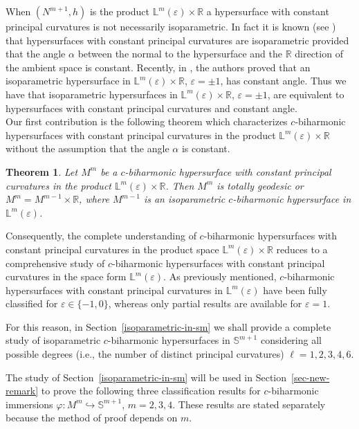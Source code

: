 \documentclass[11pt,leqno]{amsart}
\theoremstyle{plain}
\newtheorem{theorem}                {Theorem}      [section]
\theoremstyle{definition}
\numberwithin{equation}{section}
\def \R{{\mathbb R}}
\def \s{{\mathbb S}}
\numberwithin{equation}{section}
\begin{document}
When $(N^{m+1},h)$ is the product ${\mathbb L}^{m}(\varepsilon)\times \R$ a hypersurface with constant principal curvatures is not necessarily isoparametric. In fact it is known (see \cite{MR4032814}) that hypersurfaces with constant principal curvatures are isoparametric provided that the angle $\alpha$ between the normal to the hypersurface and the $\R$ direction of the ambient space is constant. Recently, in \cite{arXiv:2411.11506}, the authors proved that an isoparametric hypersurface in ${\mathbb L}^{m}(\varepsilon)\times \R$, $\varepsilon=\pm 1$, has constant angle. Thus we have that isoparametric hypersurfaces in ${\mathbb L}^{m}(\varepsilon)\times \R$, $\varepsilon=\pm 1$, are equivalent to hypersurfaces with constant principal curvatures and constant angle.\\

Our first contribution is the following theorem which characterizes $c$-biharmo\-nic hypersurfaces with constant principal curvatures in the product ${\mathbb L}^{m}(\varepsilon)\times \R$ without the assumption that the angle $\alpha$ is constant.

\begin{theorem}\label{theorem:cbiharmonicconstantcurvatures}
Let $M^m$ be a $c$-biharmonic hypersurface with constant principal curvatures in the product ${\mathbb L}^{m}(\varepsilon)\times \R$. Then $M^m$ is totally geodesic or $M^m=M^{m-1}\times\R$, where $M^{m-1}$ is an isoparametric $c$-biharmonic hypersurface in ${\mathbb L}^{m}(\varepsilon)$.
\end{theorem}

Consequently, the complete understanding of $c$-biharmonic hypersurfaces with constant principal curvatures in the product space ${\mathbb L}^{m}(\varepsilon) \times \R$ reduces to a comprehensive study of $c$-biharmonic hypersurfaces with constant principal curvatures in the space form ${\mathbb L}^m(\varepsilon)$. As previously mentioned, $c$-biharmonic hypersurfaces with constant principal curvatures in ${\mathbb L}^m(\varepsilon)$ have been fully classified for $\varepsilon \in \{-1, 0\}$, whereas only partial results are available for $\varepsilon = 1$. 

For this reason, in Section~\ref{isoparametric-in-sm} we shall provide a complete study of isoparametric $c$-biharmonic  hypersurfaces in ${\mathbb S}^{m+1}$ considering all possible degrees (i.e., the number of distinct principal curvatures) $\ell = 1, 2, 3, 4, 6$. 

The study of Section~\ref{isoparametric-in-sm} will be used in Section~\ref{sec-new-remark} to prove the following three classification results for $c$-biharmonic immersions $\varphi: M^m \hookrightarrow \s^{m+1}$, $m=2,3,4$. These results are stated separately because the method of proof depends on $m$.
\end{document}
